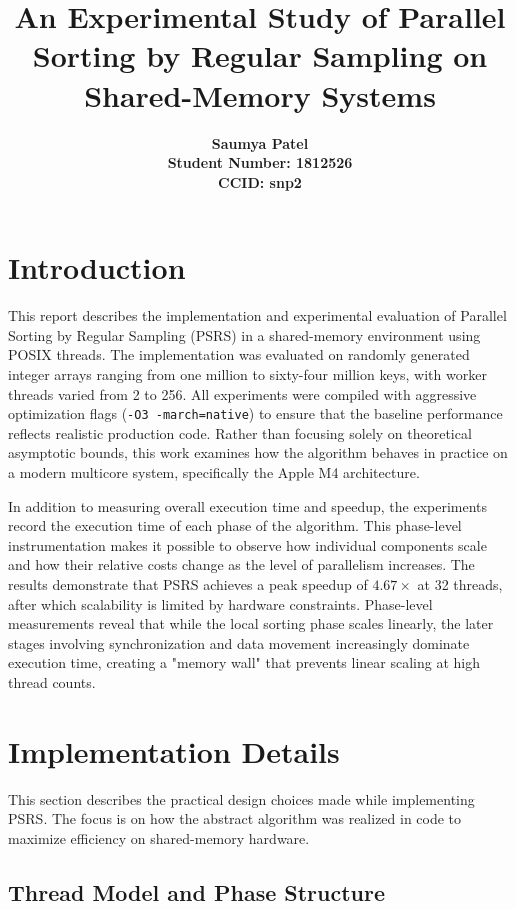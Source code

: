 \documentclass[11pt]{article}
\title{\vspace{2cm}\Huge\bfseries An Experimental Study of Parallel Sorting by Regular Sampling on Shared-Memory Systems}
\author{\vspace{1cm}\Large\bfseries Saumya Patel \\ 
        \large Student Number: 1812526 \\ 
        \large CCID: snp2}
\date{}
\begin{document}
\maketitle
\newpage

\section{Introduction}

This report describes the implementation and experimental evaluation of Parallel Sorting by Regular Sampling (PSRS) in a shared-memory environment using POSIX threads. The implementation was evaluated on randomly generated integer arrays ranging from one million to sixty-four million keys, with worker threads varied from 2 to 256. All experiments were compiled with aggressive optimization flags (\texttt{-O3 -march=native}) to ensure that the baseline performance reflects realistic production code. Rather than focusing solely on theoretical asymptotic bounds, this work examines how the algorithm behaves in practice on a modern multicore system, specifically the Apple M4 architecture.

In addition to measuring overall execution time and speedup, the experiments record the execution time of each phase of the algorithm. This phase-level instrumentation makes it possible to observe how individual components scale and how their relative costs change as the level of parallelism increases. The results demonstrate that PSRS achieves a peak speedup of $4.67\times$ at 32 threads, after which scalability is limited by hardware constraints. Phase-level measurements reveal that while the local sorting phase scales linearly, the later stages involving synchronization and data movement increasingly dominate execution time, creating a "memory wall" that prevents linear scaling at high thread counts.

\section{Implementation Details}

This section describes the practical design choices made while implementing PSRS. The focus is on how the abstract algorithm was realized in code to maximize efficiency on shared-memory hardware.

\subsection{Thread Model and Phase Structure}
\end{document}
